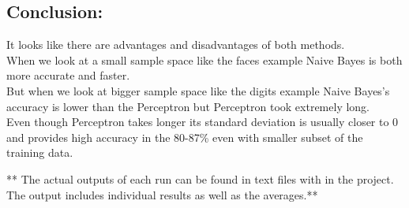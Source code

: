 \documentclass[11]{article}
\begin{document}
\subsection*{Conclusion:}
\qquad It looks like there are advantages and disadvantages of both methods.
\\ When we look at a small sample space like the faces example Naive Bayes is both more accurate and faster.
\\ But when we look at bigger sample space like the digits example Naive Bayes's accuracy is lower than the Perceptron but Perceptron took extremely long.
\\ Even though Perceptron takes longer its standard deviation is usually closer to 0 and provides high accuracy in the 80-87\% even with smaller subset of the training data.
\\ 
\begin{center}
** The actual outputs of each run can be found in text files with in the project. The output includes individual results as well as the averages.**
\end{center}
\end{document}
